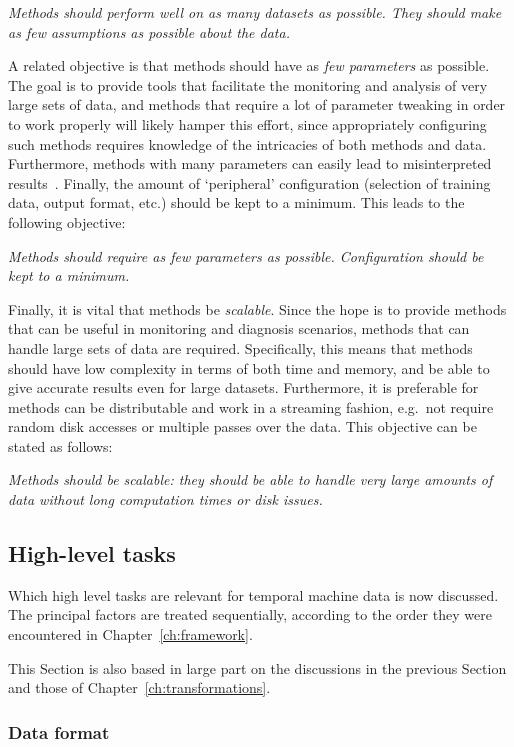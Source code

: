   \emph{Methods should perform well on as many datasets as possible. They should make as few assumptions as possible about the data.}

A related objective is that methods should have as \emph{few parameters} as possible. The goal is to provide tools that facilitate the monitoring and analysis of very large sets of data, and methods that require a lot of parameter tweaking in order to work properly will likely hamper this effort, since appropriately configuring such methods requires knowledge of the intricacies of both methods and data. Furthermore, methods with many parameters can easily lead to misinterpreted results~\cite{keogh2}. Finally, the amount of `peripheral' configuration (selection of training data, output format, etc.) should be kept to a minimum. This leads to the following objective:

  \emph{Methods should require as few parameters as possible. Configuration should be kept to a minimum.}

Finally, it is vital that methods be \emph{scalable}. Since the hope is to provide methods that can be useful in monitoring and diagnosis scenarios, methods that can handle large sets of data are required. Specifically, this means that methods should have low complexity in terms of both time and memory, and be able to give accurate results even for large datasets. Furthermore, it is preferable for methods can be distributable and work in a streaming fashion, e.g.\ not require random disk accesses or multiple passes over the data. This objective can be stated as follows:

  \emph{Methods should be scalable: they should be able to handle very large amounts of data without long computation times or disk issues.}

\subsection{High-level tasks}
\label{sect:relevant_tasks}

Which high level tasks are relevant for temporal machine data is now discussed. The principal factors are treated sequentially, according to the order they were encountered in Chapter~\ref{ch:framework}.

This Section is also based in large part on the discussions in the previous Section and those of Chapter~\ref{ch:transformations}. 

\subsubsection{Data format}
\label{sect:relevant_data_format}

